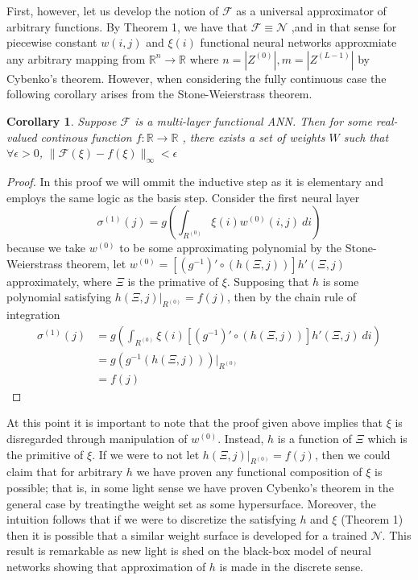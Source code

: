 \documentclass{ib-assignment}
\newtheorem{corollary}{Corollary}
\begin{document}
First, however, let us develop the notion of $\mathcal{F}$ as a universal approximator of arbitrary functions. By Theorem 1, we have that $\mathcal{F} \equiv \mathcal{N}$ ,and in that sense for piecewise constant $w(i,j)$ and $\xi(i)$ functional neural networks approxmiate any arbitrary mapping from $\mathbb{R}^n \to \mathbb{R}$ where $n = |Z^{(0)}|, m = |Z^{(L-1)}|$ by Cybenko's theorem. However, when considering the fully continuous case the following corollary arises from the Stone-Weierstrass theorem.
\begin{corollary}
Suppose $\mathcal{F}$  is a multi-layer functional ANN. Then for some real-valued continous function $f:\mathbb{R} \to \mathbb{R}$ , there exists a set of weights $W$ such that  $\forall \epsilon > 0$, $\|\mathcal{F}(\xi) - f(\xi)\|_\infty < \epsilon$
\end{corollary}
\begin{proof}
In this proof we will ommit the inductive step as it is elementary and employs the same logic as the basis step. Consider the first neural layer
$$\sigma^{(1)}(j) = g\left(\int_{R^{(0)}}   \xi(i) w^{(0)}(i,j) \ di\right)$$
because we take $w^{(0)}$ to be some approximating polynomial by the Stone-Weierstrass theorem, let $w^{(0)} = \left[(g^{-1})' \circ\left(h(\Xi,j)\right)\right]h'(\Xi,j)$ approximately, where $\Xi$ is the primative of $\xi$. Supposing that $h$ is some polynomial satisfying $h(\Xi,j)\Big|_{R^{(0)}} = f(j)$, then by the chain rule of integration
\[
	\begin{aligned}
    \sigma^{(1)}(j) &=g\left(\int_{R^{(0)}}   \xi(i)  \left[(g^{-1})' \circ\left(h(\Xi,j)\right)\right]h'(\Xi,j)\ di\right) \\
    &= g\left(g^{-1}\left(h(\Xi,j)\right)\right)\Bigg|_{R^{(0)}} \\
    &= f(j)
    \end{aligned}
\]
\end{proof}


At this point it is important to note that the proof given above implies that $\xi$ is disregarded through manipulation of $w^{(0)}$. Instead, $h$ is a function of $\Xi$ which is the primitive of $\xi$. If we were to not let $h(\Xi,j)\Big|_{R^{(0)}} = f(j)$, then we could claim that for arbitrary $h$ we have proven any functional composition of $\xi$ is possible; that is, in some light sense we have proven Cybenko's theorem in the general case by treatingthe weight set as some hypersurface. Moreover, the intuition follows that if we were to discretize the satisfying $h$ and $\xi$ (Theorem 1) then it is possible that a similar weight surface is developed for a trained $\mathcal{N}$. This result is remarkable as new light is shed on the black-box model of neural networks showing that approximation of $h$ is made in the discrete sense. 
\end{document}
